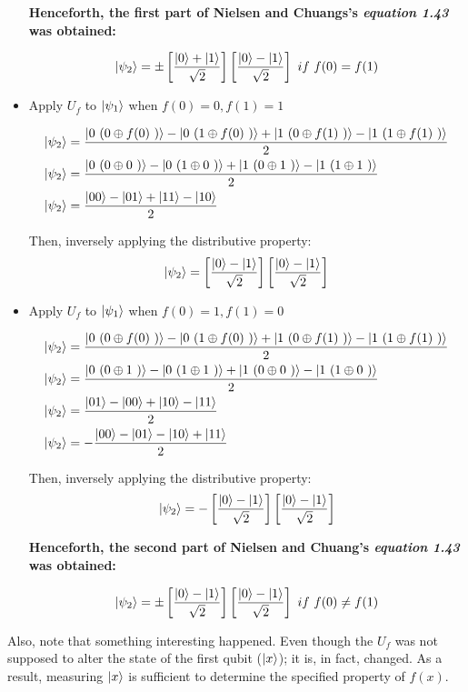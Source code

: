 \begin{itemize}
    \textbf{Henceforth, the first part of Nielsen and Chuangs's \emph{equation 1.43} was obtained:}
    
    \[
    \ket{\psi_2} = \pm \left[ \frac{\ket{0} + \ket{1}}{\sqrt{2}} \right]
        \left[ \frac{\ket{0} - \ket{1}}{\sqrt{2}} \right]\ if \ f(0) = f(1)
    \]
    
    \item Apply \(U_f\) to \(\ket{\psi_1}\) when \(f(0) = 0, f(1) = 1\)
    
        \begin{align}
        \ket{\psi_2} &= \frac{\ket{0\ (0 \oplus f(0)\ )} - \ket{0\ (1 \oplus f(0)\ )} +
        \ket{1\ (0 \oplus f(1)\ )} - \ket{1\ (1 \oplus f(1)\ )}}{2}
        \\
        \ket{\psi_2} &=  \frac{\ket{0\ (0 \oplus 0\ )} - \ket{0\ (1 \oplus 0\ )} +
        \ket{1\ (0 \oplus 1\ )} - \ket{1\ (1 \oplus 1\ )}}{2}
        \\
        \ket{\psi_2} &= \frac{\ket{00} - \ket{01} + \ket{11} - \ket{10}}{2}
    \end{align}
    
    Then, inversely applying the distributive property:
    \begin{equation}
        \ket{\psi_2} =
        \left[ \frac{\ket{0} - \ket{1}}{\sqrt{2}} \right]
        \left[ \frac{\ket{0} - \ket{1}}{\sqrt{2}} \right]
    \end{equation}
    
    \item Apply \(U_f\) to \(\ket{\psi_1}\) when \(f(0) = 1, f(1) = 0\)
    
        \begin{align}
        \ket{\psi_2} &= \frac{\ket{0\ (0 \oplus f(0)\ )} - \ket{0\ (1 \oplus f(0)\ )} +
        \ket{1\ (0 \oplus f(1)\ )} - \ket{1\ (1 \oplus f(1)\ )}}{2}
        \\
        \ket{\psi_2} &=  \frac{\ket{0\ (0 \oplus 1\ )} - \ket{0\ (1 \oplus 1\ )} +
        \ket{1\ (0 \oplus 0\ )} - \ket{1\ (1 \oplus 0\ )}}{2}
        \\
        \ket{\psi_2} &= \frac{\ket{01} - \ket{00} + \ket{10} - \ket{11}}{2}
        \\
        \ket{\psi_2} &= - \frac{\ket{00} - \ket{01} - \ket{10} + \ket{11}}{2}
    \end{align}
    
    Then, inversely applying the distributive property:
    \begin{equation}
        \ket{\psi_2} = -
        \left[ \frac{\ket{0} - \ket{1}}{\sqrt{2}} \right]
        \left[ \frac{\ket{0} - \ket{1}}{\sqrt{2}} \right]
    \end{equation}
    
    \textbf{Henceforth, the second part of Nielsen and Chuang's \emph{equation 1.43} was obtained:}
    
    \[
    \ket{\psi_2} = \pm \left[ \frac{\ket{0} - \ket{1}}{\sqrt{2}} \right]
        \left[ \frac{\ket{0} - \ket{1}}{\sqrt{2}} \right]\ if \ f(0) \neq f(1)
    \]
\end{itemize}

Also, note that something interesting happened. Even though the \(U_f\) was not supposed to alter the state of the first qubit (\(\ket{x}\)); it is, in fact, changed. As a result, measuring \(\ket{x}\) is sufficient to determine the specified property of \(f(x)\).